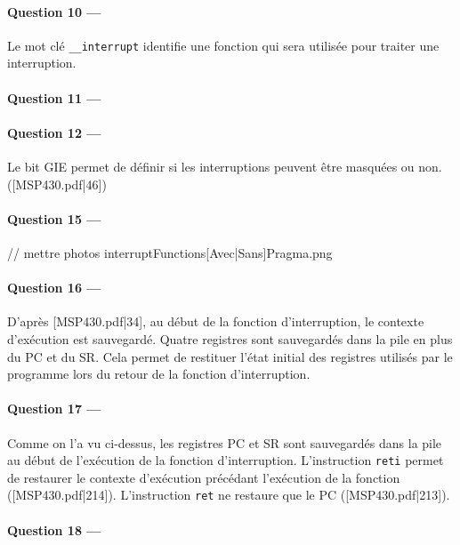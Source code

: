 \documentclass[a4paper,11pt,article]{memoir}
\begin{document}
\paragraph{Question 10 ---}  Le mot clé \verb|__interrupt| identifie une fonction qui sera utilisée pour traiter une interruption.

\paragraph{Question 11 ---}  

\paragraph{Question 12 ---}  Le bit GIE permet de définir si les interruptions peuvent être masquées ou non. ([MSP430.pdf|46])

\paragraph{Question 15 ---}  // mettre photos interruptFunctions[Avec|Sans]Pragma.png

\paragraph{Question 16 ---}  D'après [MSP430.pdf|34], au début de la fonction d'interruption, le contexte d'exécution est sauvegardé. Quatre registres sont sauvegardés dans la pile en plus du PC et du SR. Cela permet de restituer l'état initial des registres utilisés par le programme lors du retour de la fonction d'interruption.

\paragraph{Question 17 ---}  Comme on l'a vu ci-dessus, les registres PC et SR sont sauvegardés dans la pile au début de l'exécution de la fonction d'interruption. L'instruction \verb|reti| permet de restaurer le contexte d'exécution précédant l'exécution de la fonction ([MSP430.pdf|214]). L'instruction \verb|ret| ne restaure que le PC ([MSP430.pdf|213]).

\paragraph{Question 18 ---}  
\end{document}
